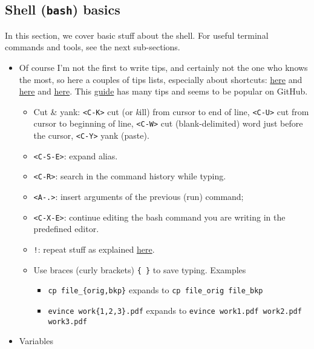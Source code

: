 \documentclass[a4paper,12pt,%
              final%
              ]{article}
\begin{document}
\subsection{Shell (\texttt{bash}) basics}
In this section, we cover basic stuff about the shell. For useful terminal commands and tools, see the next sub-sections.
\begin{itemize}
  \item Of course I'm not the first to write tips, and certainly not the one who knows the most, so here a couples of tips lists, especially about shortcuts: \href{https://www.techrepublic.com/article/20-terminal-shortcuts-developers-need-to-know/}{here} and \href{https://www.howtogeek.com/howto/ubuntu/keyboard-shortcuts-for-bash-command-shell-for-ubuntu-debian-suse-redhat-linux-etc/}{here} and \href{https://devhints.io/bash}{here}. This \href{https://github.com/jlevy/the-art-of-command-line}{guide} has many tips and seems to be popular on GitHub.
    \begin{itemize}
      \item Cut \& yank: \texttt{<C-K>} cut (or \emph{k}ill) from cursor to end of line, \texttt{<C-U>} cut from cursor to beginning of line, \texttt{<C-W>} cut (blank-delimited) word just before the cursor, \texttt{<C-Y>} yank (paste).
      \item \texttt{<C-S-E>}: expand alias.
      \item \texttt{<C-R>}: search in the command history while typing.
      \item \texttt{<A-.>}: insert arguments of the previous (run) command;
      \item \texttt{<C-X-E>}: continue editing the bash command you are writing in the predefined editor.
      \item \texttt{!}: repeat stuff as explained \href{https://www.redhat.com/sysadmin/bash-bang-commands}{here}.
      \item Use braces (curly brackets) \verb|{ }| to save typing. Examples
        \begin{itemize}
          \item \verb|cp file_{orig,bkp}| expands to \verb|cp file_orig file_bkp|
          \item \verb|evince work{1,2,3}.pdf| expands to \verb|evince work1.pdf work2.pdf work3.pdf|
        \end{itemize}
    \end{itemize}
  \item Variables
    \begin{itemize}

\end{itemize}
\end{itemize}
\end{document}

